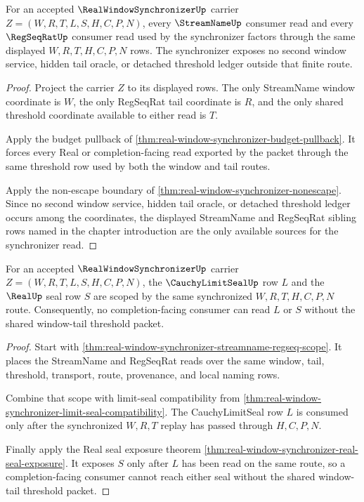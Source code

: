\begin{theorem}
\label{thm:real-window-synchronizer-streamname-regseq-scope}
For an accepted $\RealWindowSynchronizerUp$ carrier $Z=(W,R,T,L,S,H,C,P,N)$, every $\StreamNameUp$ consumer read and every $\RegSeqRatUp$ consumer read used by the synchronizer factors through the same displayed $W,R,T,H,C,P,N$ rows. The synchronizer exposes no second window service, hidden tail oracle, or detached threshold ledger outside that finite route.
\end{theorem}
\begin{proof}
Project the carrier $Z$ to its displayed rows. The only StreamName window coordinate is $W$, the only RegSeqRat tail coordinate is $R$, and the only shared threshold coordinate available to either read is $T$.

Apply the budget pullback of \autoref{thm:real-window-synchronizer-budget-pullback}. It forces every Real or completion-facing read exported by the packet through the same threshold row used by both the window and tail routes.

Apply the non-escape boundary of \autoref{thm:real-window-synchronizer-nonescape}. Since no second window service, hidden tail oracle, or detached threshold ledger occurs among the coordinates, the displayed StreamName and RegSeqRat sibling rows named in the chapter introduction are the only available sources for the synchronizer read.
\end{proof}

\begin{theorem}
\label{thm:real-window-synchronizer-limit-seal-scope}
For an accepted $\RealWindowSynchronizerUp$ carrier $Z=(W,R,T,L,S,H,C,P,N)$, the $\CauchyLimitSealUp$ row $L$ and the $\RealUp$ seal row $S$ are scoped by the same synchronized $W,R,T,H,C,P,N$ route. Consequently, no completion-facing consumer can read $L$ or $S$ without the shared window-tail threshold packet.
\end{theorem}
\begin{proof}
Start with \autoref{thm:real-window-synchronizer-streamname-regseq-scope}. It places the StreamName and RegSeqRat reads over the same window, tail, threshold, transport, route, provenance, and local naming rows.

Combine that scope with limit-seal compatibility from \autoref{thm:real-window-synchronizer-limit-seal-compatibility}. The CauchyLimitSeal row $L$ is consumed only after the synchronized $W,R,T$ replay has passed through $H,C,P,N$.

Finally apply the Real seal exposure theorem \autoref{thm:real-window-synchronizer-real-seal-exposure}. It exposes $S$ only after $L$ has been read on the same route, so a completion-facing consumer cannot reach either seal without the shared window-tail threshold packet.
\end{proof}

